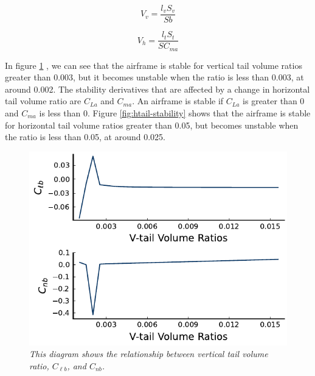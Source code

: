 \documentclass{journal}
\begin{document}
	\begin{equation}
		V_v = \frac{l_vS_v}{Sb}
		\label{eqn:vtail-ratio}
	\end{equation}

	\begin{equation}
		V_h = \frac{l_tS_t}{SC_{ma}}
		\label{eqn:htail-ratio}
	\end{equation}

	In figure \ref{fig:vtail-stability} , we can see that the airframe is stable for vertical tail volume ratios greater than 0.003, but it becomes unstable when the ratio is less than 0.003, at around 0.002. The stability derivatives that are affected by a change in horizontal tail volume ratio are \(C_{La}\) and \(C_{ma}\). An airframe is stable if \(C_{La}\) is greater than 0 and \(C_{ma}\) is less than 0. Figure \ref{fig:htail-stability} shows that the airframe is stable for horizontal tail volume ratios greater than 0.05, but becomes unstable when the ratio is less than 0.05, at around 0.025.\\

	\begin{figure}[H]
		\centering
		\includegraphics[scale=0.73]{../graphics/vtail-stability.pdf}
		\caption{\emph{This diagram shows the relationship between vertical tail volume ratio, \(C_{\ell{b}}\), and \(C_{nb}\).}}
		\label{fig:vtail-stability}
	\end{figure}
\end{document}
